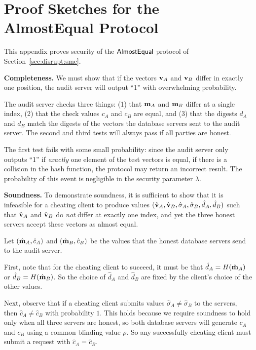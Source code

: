 \documentclass[10pt,twocolumn]{article}
\newcommand{\hsA}{\hat{\sigma}_A}
\newcommand{\hsB}{\hat{\sigma}_B}
\newcommand{\mA}{{\bf m}_A}
\newcommand{\hmA}{\hat{{\bf m}}_A}
\newcommand{\hcA}{\hat{c}_A}
\newcommand{\hcB}{\hat{c}_B}
\newcommand{\mB}{{\bf m}_B}
\newcommand{\hmB}{\hat{{\bf m}}_B}
\newcommand{\hvA}{\hat{{\bf v}}_A}
\newcommand{\hvB}{\hat{{\bf v}}_B}
\newcommand{\nicepara}[1]{\medskip\noindent\textbf{#1.}}
\begin{document}
\section{Proof Sketches for the\\{\sf AlmostEqual} Protocol}
\label{app:almostequal}

This appendix proves security of the ${\sf AlmostEqual}$ protocol 
of Section~\ref{sec:disrupt:smc}.

\nicepara{Completeness}
We must show that 
if the vectors ${\bf v}_A$ and ${\bf v}_B$ differ
in exactly one position, the audit server will output ``1''
with overwhelming probability.

The audit server checks three things:
(1) that $\mA$ and $\mB$ differ at a single index, 
(2) that the check values $c_A$ and $c_B$ are equal, and
(3) that the digests $d_A$ and $d_B$ match the digests
of the vectors the database servers sent to the audit server.
The second and third tests will always pass if all parties are honest.

The first test fails with some small probability:
since the audit server only outputs ``1'' if {\em exactly}
one element of the test vectors is equal, if there
is a collision in the hash function, the
protocol may return an incorrect result.
The probability of this event is negligible
in the security parameter $\lambda$.

\nicepara{Soundness}
To demonstrate soundness, it is sufficient to show that it is infeasible
for a cheating client to produce values
$(\hvA, \hvB, \hsA, \hsB, \hat{d}_A, \hat{d}_B)$
such that $\hvA$ and $\hvB$ do {\em not} differ at exactly one index, and
yet the three honest servers accept these vectors as almost equal.

Let $(\hmA, \hcA)$ and $(\hmB, \hcB)$ 
be the values that the honest database servers send 
to the audit server.

First, note that for the cheating client to succeed, it must be that
$\hat{d}_A = H(\hmA)$ or $\hat{d}_B = H(\hmB)$.
So the choice of $\hat{d}_A$ and $\hat{d}_B$ are fixed by the client's choice
of the other values.

Next, observe that if a cheating client submits values $\hsA \neq \hsB$ to
the servers, then $\hcA \neq \hcB$ with probability $1$.
This holds because we require soundness to hold only when all three
servers are honest, so both database servers will generate
$c_A$ and $c_B$ using a common blinding value $\rho$.
So any successfully cheating client must submit a request with
$\hcA = \hcB$.
\end{document}

